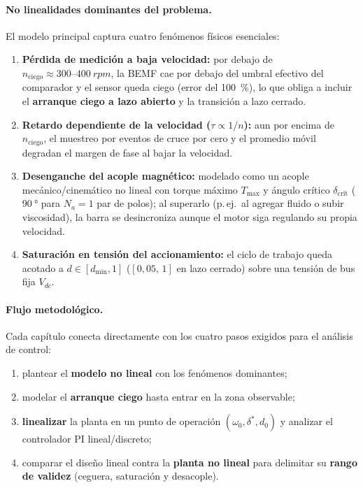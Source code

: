 \documentclass[11pt,a4paper,oneside]{report}
\theoremstyle{definition}
\theoremstyle{remark}
\begin{document}
\paragraph{No linealidades dominantes del problema.} El modelo principal
captura cuatro fenómenos físicos esenciales:
\begin{enumerate}
  \item \textbf{Pérdida de medición a baja velocidad:} por debajo de
        $n_{\text{ciego}}\approx 300\text{--}\SI{400}{rpm}$, la BEMF cae por
        debajo del umbral efectivo del comparador y el sensor queda ciego
        (error del \SI{100}{\percent}), lo que obliga a incluir el
        \textbf{arranque ciego a lazo abierto} y la transición a lazo cerrado.
  \item \textbf{Retardo dependiente de la velocidad ($\tau \propto 1/n$):}
        aun por encima de $n_{\text{ciego}}$, el muestreo por eventos de cruce
        por cero y el promedio móvil degradan el margen de fase al bajar la
        velocidad.
  \item \textbf{Desenganche del acople magnético:} modelado como un acople
        mecánico/cinemático no lineal con torque máximo $T_{\max}$ y ángulo
        crítico $\delta_{\text{crit}}$ ($\SI{90}{\degree}$ para $N_a=1$ par de
        polos); al superarlo (p.\,ej.\ al agregar fluido o subir viscosidad),
        la barra se desincroniza aunque el motor siga regulando su propia
        velocidad.
  \item \textbf{Saturación en tensión del accionamiento:} el ciclo de trabajo
        queda acotado a $d\in[d_{\min},1]$ ($[0{,}05,\,1]$ en lazo cerrado) sobre
        una tensión de bus fija $V_{dc}$.
\end{enumerate}

\paragraph{Flujo metodológico.} Cada capítulo conecta directamente con los cuatro
pasos exigidos para el análisis de control:
\begin{enumerate}
  \item plantear el \textbf{modelo no lineal} con los fenómenos dominantes;
  \item modelar el \textbf{arranque ciego} hasta entrar en la zona observable;
  \item \textbf{linealizar} la planta en un punto de operación $(\omega_0,\delta^\ast,d_0)$
        y analizar el controlador PI lineal/discreto;
  \item comparar el diseño lineal contra la \textbf{planta no lineal} para
        delimitar su \textbf{rango de validez} (ceguera, saturación y desacople).
\end{enumerate}
\end{document}
